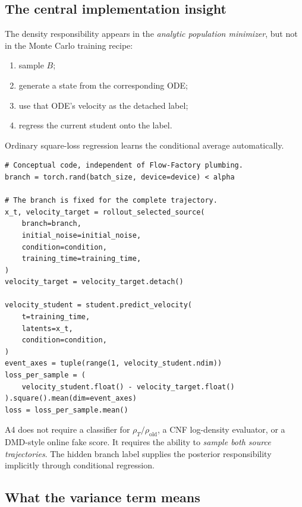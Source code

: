 \documentclass[11pt,a4paper]{article}
\theoremstyle{plain}
\theoremstyle{definition}
\begin{document}
\subsection{The central implementation insight}

The density responsibility appears in the \emph{analytic population minimizer}, but not in the
Monte Carlo training recipe:
\begin{enumerate}[leftmargin=1.6em]
\item sample $B$;
\item generate a state from the corresponding ODE;
\item use that ODE's velocity as the detached label;
\item regress the current student onto the label.
\end{enumerate}
Ordinary square-loss regression learns the conditional average automatically.

\begin{lstlisting}[style=goodpython,caption={Minimal conceptual A4 training step.}]
# Conceptual code, independent of Flow-Factory plumbing.
branch = torch.rand(batch_size, device=device) < alpha

# The branch is fixed for the complete trajectory.
x_t, velocity_target = rollout_selected_source(
    branch=branch,
    initial_noise=initial_noise,
    condition=condition,
    training_time=training_time,
)
velocity_target = velocity_target.detach()

velocity_student = student.predict_velocity(
    t=training_time,
    latents=x_t,
    condition=condition,
)
event_axes = tuple(range(1, velocity_student.ndim))
loss_per_sample = (
    velocity_student.float() - velocity_target.float()
).square().mean(dim=event_axes)
loss = loss_per_sample.mean()
\end{lstlisting}

\begin{tcolorbox}[colback=green!5,colframe=green!50!black,title=No classifier and no fake-score network]
A4 does not require a classifier for $\rho_T/\rho_{\mathrm{old}}$, a CNF log-density evaluator,
or a DMD-style online fake score.  It requires the ability to \emph{sample both source
trajectories}.  The hidden branch label supplies the posterior responsibility implicitly through
conditional regression.
\end{tcolorbox}

\subsection{What the variance term means}
\end{document}
